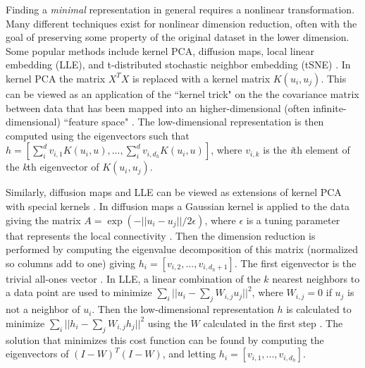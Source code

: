 \documentclass[preprint,aps,pre,letterpaper,onecolumn,superscriptaddress]{revtex4-2} %
\begin{document}
Finding a \emph{minimal} representation in general requires a nonlinear transformation. Many different techniques exist for nonlinear dimension reduction, often with the goal of preserving some property of the original dataset in the lower dimension. Some popular methods include kernel PCA, diffusion maps, local linear embedding (LLE), and t-distributed stochastic neighbor embedding (tSNE) \cite{VanDerMaaten2009}. In kernel PCA the matrix $X^T X$ is replaced with a kernel matrix $K(u_i,u_j)$. This can be viewed as an application of the ``kernel trick" on the the covariance matrix between data that has been mapped into an higher-dimensional (often infinite-dimensional) ``feature space" \cite{VanDerMaaten2009}. The low-dimensional representation is then computed using the eigenvectors such that $h=[\sum_i^d v_{i,1} K(u_i,u),...,\sum_i^d v_{i,d_h} K(u_i,u)]$, where $v_{i,k}$ is the \emph{i}th element of the \emph{k}th eigenvector of $K(u_i,u_j)$.

Similarly, diffusion maps and LLE can be viewed as extensions of kernel PCA with special kernels \cite{VanDerMaaten2009}. In diffusion maps a Gaussian kernel is applied to the data giving the matrix $A=\exp (-||u_i-u_j||/2\epsilon)$, where $\epsilon$ is a tuning parameter that represents the local connectivity \cite{Ferguson2011}. Then the dimension reduction is performed by computing the eigenvalue decomposition of this matrix (normalized so columns add to one) giving $h_i=[v_{i,2},...,v_{i,d_h+1}]$. The first eigenvector is the trivial all-ones vector \cite{Ferguson2011}.
In LLE, a linear combination of the $k$ nearest neighbors to a data point are used to minimize $\sum_i||u_i-\sum_jW_{i,j}u_j||^2$, where $W_{i,j}=0$ if $u_j$ is not a neighbor of $u_i$. Then the low-dimensional representation $h$ is calculated to minimize $\sum_i||h_i-\sum_jW_{i,j}h_j||^2$ using the $W$ calculated in the first step \cite{Roweis2323}. The solution that minimizes this cost function can be found by computing the eigenvectors of $(I-W)^T(I-W)$, and letting $h_i=[v_{i,1},...,v_{i,d_h}]$.
\end{document}
